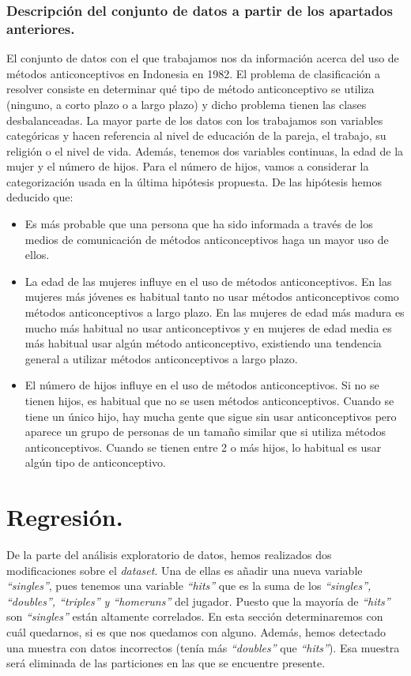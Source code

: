 \documentclass[a4paper,12pt, oneside]{book}
\begin{document}
\subsection{Descripción del conjunto de datos a partir de los apartados anteriores.}
El conjunto de datos con el que trabajamos nos da información acerca del uso de métodos anticonceptivos en Indonesia en 1982. El problema de clasificación a resolver consiste en determinar qué tipo de método anticonceptivo se utiliza (ninguno, a corto plazo o a largo plazo) y dicho problema tienen las clases desbalanceadas. La mayor parte de los datos con los trabajamos son variables categóricas y hacen referencia al nivel de educación de la pareja, el trabajo, su religión o el nivel de vida. Además, tenemos dos variables continuas, la edad de la mujer y el número de hijos. Para el número de hijos, vamos a considerar la categorización usada en la última hipótesis propuesta. De las hipótesis hemos deducido que:

\begin{itemize}
	\item Es más probable que una persona que ha sido informada a través de los medios de comunicación de métodos anticonceptivos haga un mayor uso de ellos.
	\item La edad de las mujeres influye en el uso de métodos anticonceptivos. En las mujeres más jóvenes es habitual tanto no usar métodos anticonceptivos como métodos anticonceptivos a largo plazo. En las mujeres de edad más madura es mucho más habitual no usar anticonceptivos y en mujeres de edad media es más habitual usar algún método anticonceptivo, existiendo una tendencia general a utilizar métodos anticonceptivos a largo plazo.
	\item El número de hijos influye en el uso de métodos anticonceptivos. Si no se tienen hijos, es habitual que no se usen métodos anticonceptivos. Cuando se tiene un único hijo, hay mucha gente que sigue sin usar anticonceptivos pero aparece un grupo de personas de un tamaño similar que si utiliza métodos anticonceptivos. Cuando se tienen entre 2 o más hijos, lo habitual es usar algún tipo de anticonceptivo.
\end{itemize}

\newpage
\chapter{Regresión.}
De la parte del análisis exploratorio de datos, hemos realizados dos modificaciones sobre el \textit{dataset}. Una de ellas es añadir una nueva variable \textit{``singles''}, pues tenemos una variable \textit{``hits''} que es la suma de los \textit{``singles'', ``doubles'', ``triples'' y ``homeruns''} del jugador. Puesto que la mayoría de \textit{``hits''} son \textit{``singles''} están altamente correlados. En esta sección determinaremos con cuál quedarnos, si es que nos quedamos con alguno. 
Además, hemos detectado una muestra con datos incorrectos (tenía más \textit{``doubles''} que \textit{``hits''}). Esa muestra será eliminada de las particiones en las que se encuentre presente.
\end{document}
